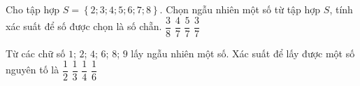 \begin{ex}%
	Cho tập hợp $S=\left\{2;3;4;5;6;7;8\right\}$. Chọn ngẫu nhiên một số từ tập hợp $S$, tính xác suất để số  được chọn là số chẵn.
	 \choice
		 {$\dfrac{3}{8}$}
		 {\True $\dfrac{4}{7}$}
		 {$\dfrac{5}{7}$}
		{$\dfrac{3}{7}$} 
\end{ex}

\begin{ex}%
	Từ các chữ số $1$; $2$; $4$; $6$; $8$; $9$  lấy ngẫu nhiên một số. Xác suất để lấy được một số nguyên tố là
	\choice 
		{$\dfrac{1}{2}$} 
		{$\dfrac{1}{3}$} 
		{$\dfrac{1}{4}$} 
		 {\True $\dfrac{1}{6}$}
\end{ex}

